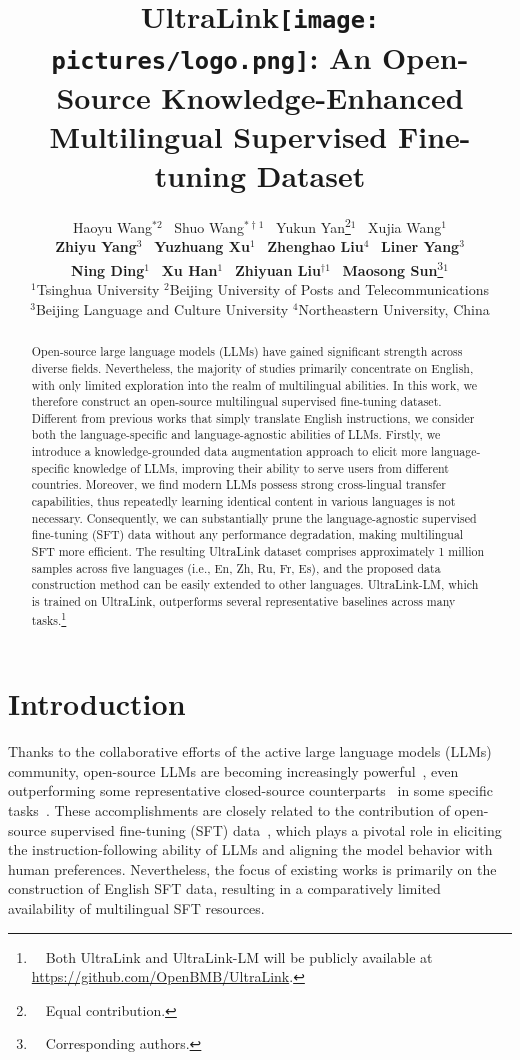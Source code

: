 \documentclass[11pt]{article}
\title{UltraLink\texttt{[image: pictures/logo.png]}: An Open-Source Knowledge-Enhanced\\
Multilingual Supervised Fine-tuning Dataset}
\author{Haoyu Wang$^{*2}$ \
  Shuo Wang$^{*\dag1}$ \
  Yukun Yan\thanks{\ \ Equal contribution.}$^{1}$ \
  Xujia Wang$^{1}$ \\
  \textbf{Zhiyu Yang}$^{3}$ \
  \textbf{Yuzhuang Xu}$^{1}$ \
  \textbf{Zhenghao Liu}$^{4}$ \
  \textbf{Liner Yang}$^3$ \\
  \textbf{Ning Ding}$^{1}$ \
  \textbf{Xu Han}$^{1}$ \
  \textbf{Zhiyuan Liu}$^{\dag1}$ \
  \textbf{Maosong Sun}\thanks{\ \ Corresponding authors.}$^{1}$ \\
  $^1$Tsinghua University \quad $^2$Beijing University of Posts and Telecommunications \\
  $^3$Beijing Language and Culture University \quad $^4$Northeastern University, China \\
  }
\begin{document}
\maketitle
\begin{abstract}
Open-source large language models (LLMs) have gained significant strength across diverse fields. Nevertheless, the majority of studies primarily concentrate on English, with only limited exploration into the realm of multilingual abilities. In this work, we therefore construct an open-source multilingual supervised fine-tuning dataset. Different from previous works that simply translate English instructions, we consider both the language-specific and language-agnostic abilities of LLMs. Firstly, we introduce a knowledge-grounded data augmentation approach to elicit more language-specific knowledge of LLMs, improving their ability to serve users from different countries. Moreover, we find modern LLMs possess strong cross-lingual transfer capabilities, thus repeatedly learning identical content in various languages is not necessary. Consequently, we can substantially prune the language-agnostic supervised fine-tuning (SFT) data without any performance degradation, making multilingual SFT more efficient. The resulting UltraLink dataset comprises approximately 1 million samples across five languages (i.e., En, Zh, Ru, Fr, Es), and the proposed data construction method can be easily extended to other languages. UltraLink-LM, which is trained on UltraLink, outperforms several representative baselines across many tasks.\footnote{\ \ Both UltraLink and UltraLink-LM will be publicly available at \url{https://github.com/OpenBMB/UltraLink}.}
\end{abstract}

\section{Introduction}

Thanks to the collaborative efforts of the active large language models (LLMs) community, open-source LLMs are becoming increasingly powerful~\cite{llama,llama2,jiang2023mistral}, even outperforming some representative closed-source counterparts~\cite{openai2023gpt4,anil2023palm} in some specific tasks~\cite{wei2023magicoder}.
These accomplishments are closely related to the contribution of open-source supervised fine-tuning (SFT) data~\cite{ding-etal-2023-enhancing,anand2023gpt4all,peng2023instruction,wang-etal-2023-self-instruct,kim-etal-2023-soda,xu-etal-2023-baize}, which plays a pivotal role in eliciting the instruction-following ability of LLMs and aligning the model behavior with human preferences. Nevertheless, the focus of existing works is primarily on the construction of English SFT data, resulting in a comparatively limited availability of multilingual SFT resources.
\end{document}
